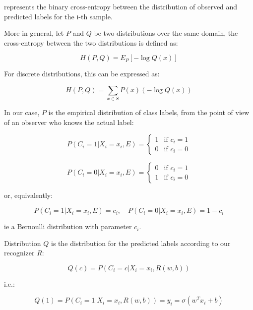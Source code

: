 represents the binary cross-entropy between the distribution of observed and predicted labels for the i-th sample.

More in general, let $P$ and $Q$ be two distributions over the same domain, the cross-entropy between the two distributions is defined as:


\begin{equation*}
H(P, Q) = E_P[-\log Q(x)]
\end{equation*}

For discrete distributions, this can be expressed as:


\begin{equation*}
H(P, Q) = \sum_{x \in S} P(x)(-\log Q(x))
\end{equation*}

In our case, $P$ is the empirical distribution of class labels, from the point of view of an observer who knows the actual label:


\begin{equation*}
P(C_i = 1 | X_i = x_i, E) = \begin{cases} 1 & \text{if } c_i = 1 \\ 0 & \text{if } c_i = 0 \end{cases}
\end{equation*}

\begin{equation*}
P(C_i = 0 | X_i = x_i, E) = \begin{cases} 0 & \text{if } c_i = 1 \\ 1 & \text{if } c_i = 0 \end{cases}
\end{equation*}

or, equivalently:


\begin{equation*}
P(C_i = 1 | X_i = x_i, E) = c_i, \quad P(C_i = 0 | X_i = x_i, E) = 1 - c_i
\end{equation*}

ie a Bernoulli distribution with parameter $c_i$.

Distribution $Q$ is the distribution for the predicted labels according to our recognizer $R$:


\begin{equation*}
Q(c) = P(C_i = c | X_i = x_i, R(w, b))
\end{equation*}

i.e.:


\begin{equation*}
Q(1) = P(C_i = 1 | X_i = x_i, R(w, b)) = y_i = \sigma(w^T x_i + b)
\end{equation*}

